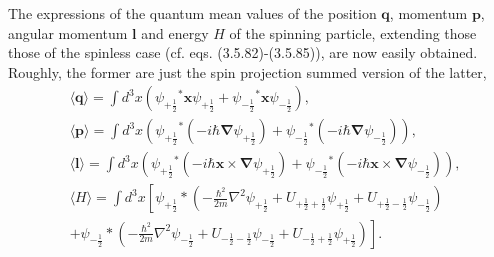\documentclass{article}
\begin{document}
The expressions of the quantum mean values of the position $\boldsymbol{q}$, momentum $\boldsymbol{p}$, angular momentum $\boldsymbol{l}$ and energy $H$ of the spinning particle, extending those those of the spinless case (cf. eqs. (3.5.82)-(3.5.85)), are now easily obtained. Roughly, the former are just the spin projection summed version of the latter,
$$
\begin{align*}
& \langle\boldsymbol{q}\rangle=\int d^{3} x\left(\psi_{+\frac{1}{2}}{ }^{*} \boldsymbol{x} \psi_{+\frac{1}{2}}+\psi_{-\frac{1}{2}}{ }^{*} \boldsymbol{x} \psi_{-\frac{1}{2}}\right),  \tag{3.21.15}\\
& \langle\boldsymbol{p}\rangle=\int d^{3} x\left({\psi_{+\frac{1}{2}}}^{*}\left(-i \hbar \boldsymbol{\nabla} \psi_{+\frac{1}{2}}\right)+\psi_{-\frac{1}{2}}{ }^{*}\left(-i \hbar \boldsymbol{\nabla} \psi_{-\frac{1}{2}}\right)\right),  \tag{3.21.16}\\
& \langle\boldsymbol{l}\rangle=\int d^{3} x\left(\psi_{+\frac{1}{2}}{ }^{*}\left(-i \hbar \boldsymbol{x} \times \boldsymbol{\nabla} \psi_{+\frac{1}{2}}\right)+\psi_{-\frac{1}{2}}{ }^{*}\left(-i \hbar \boldsymbol{x} \times \boldsymbol{\nabla} \psi_{-\frac{1}{2}}\right)\right),  \tag{3.21.17}\\
& \langle H\rangle=\int d^{3} x\left[\psi_{+\frac{1}{2}} *\left(-\frac{\hbar^{2}}{2 m} \nabla^{2} \psi_{+\frac{1}{2}}+U_{+\frac{1}{2}+\frac{1}{2}} \psi_{+\frac{1}{2}}+U_{+\frac{1}{2}-\frac{1}{2}} \psi_{-\frac{1}{2}}\right)\right.  \tag{3.21.18}\\
& \left.+\psi_{-\frac{1}{2}} *\left(-\frac{\hbar^{2}}{2 m} \nabla^{2} \psi_{-\frac{1}{2}}+U_{-\frac{1}{2}-\frac{1}{2}} \psi_{-\frac{1}{2}}+U_{-\frac{1}{2}+\frac{1}{2}} \psi_{+\frac{1}{2}}\right)\right] .
\end{align*}
$$
\end{document}
